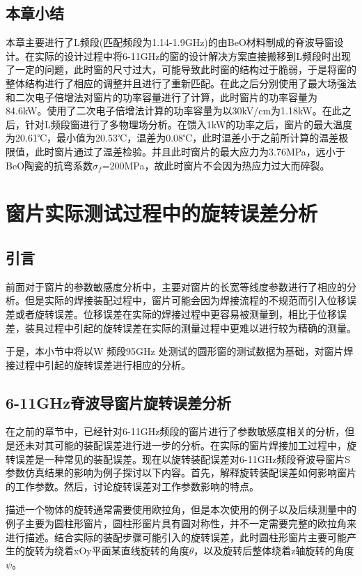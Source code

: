 \documentclass[master]{thesis-uestc}
\begin{document}
\section{本章小结}
本章主要进行了L频段(匹配频段为1.14-1.9GHz)的由BeO材料制成的脊波导窗设计。在实际的设计过程中将6-11GHz的窗的设计解决方案直接搬移到L频段时出现了一定的问题，此时窗的尺寸过大，可能导致此时窗的结构过于脆弱，于是将窗的整体结构进行了相应的调整并且进行了重新匹配。在此之后分别使用了最大场强法和二次电子倍增法对窗片的功率容量进行了计算，此时窗片的功率容量为84.6kW。使用了二次电子倍增法计算的功率容量为以30kV/cm为1.18kW。在此之后，针对L频段窗进行了多物理场分析。在馈入1kW的功率之后，窗片的最大温度为20.61℃，最小值为20.53℃，温差为0.08℃，此时温差小于之前所计算的温差极限值，此时窗片通过了温差检验。并且此时窗片的最大应力为3.76MPa，远小于BeO陶瓷的抗弯系数\(\sigma_f\)=200MPa，故此时窗片不会因为热应力过大而碎裂。

\chapter{窗片实际测试过程中的旋转误差分析}
\section{引言}
前面对于窗片的参数敏感度分析中，主要对窗片的长宽等线度参数进行了相应的分析。但是实际的焊接装配过程中，窗片可能会因为焊接流程的不规范而引入位移误差或者旋转误差。位移误差在实际的焊接过程中更容易被测量到，相比于位移误差，装具过程中引起的旋转误差在实际的测量过程中更难以进行较为精确的测量。

于是，本小节中将以W 频段95GHz 处测试的圆形窗的测试数据为基础，对窗片焊接过程中引起的旋转误差进行相应的分析。

\section{6-11GHz脊波导窗片旋转误差分析}\label{sec:6-11GHz脊波导窗片旋转误差分析}
在之前的章节中，已经针对6-11GHz频段的窗片进行了参数敏感度相关的分析，但是还未对其可能的装配误差进行进一步的分析。在实际的窗片焊接加工过程中，旋转误差是一种常见的装配误差。现在以旋转装配误差对6-11GHz频段脊波导窗片S参数仿真结果的影响为例子探讨以下内容。首先，解释旋转装配误差如何影响窗片的工作参数。然后，讨论旋转误差对工作参数影响的特点。

描述一个物体的旋转通常需要使用欧拉角，但是本次使用的例子以及后续测量中的例子主要为圆柱形窗片，圆柱形窗片具有圆对称性，并不一定需要完整的欧拉角来进行描述。结合实际的装配步骤可能引入的旋转误差，此时圆柱形窗片主要可能产生的旋转为绕着xOy平面某直线旋转的角度\(\theta\)，以及旋转后整体绕着z轴旋转的角度\(\psi\)。
\end{document}
